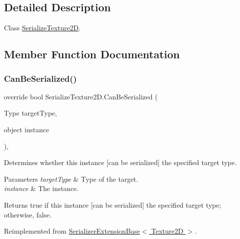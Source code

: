 \subsection{Detailed Description}
Class \hyperlink{class_serialize_texture2_d}{Serialize\+Texture2D}. 



\subsection{Member Function Documentation}
\mbox{\label{class_serialize_texture2_d_a4485a35955c52146f174efa44317787e}} 
\subsubsection{\texorpdfstring{Can\+Be\+Serialized()}{CanBeSerialized()}}
{\footnotesize\ttfamily override bool Serialize\+Texture2\+D.\+Can\+Be\+Serialized (\begin{DoxyParamCaption}\item[{Type}]{target\+Type,  }\item[{object}]{instance }\end{DoxyParamCaption})\hspace{0.3cm}{\ttfamily [inline]}, {\ttfamily [virtual]}}



Determines whether this instance \mbox{[}can be serialized\mbox{]} the specified target type. 


\begin{DoxyParams}{Parameters}
{\em target\+Type} & Type of the target.\\
\hline
{\em instance} & The instance.\\
\hline
\end{DoxyParams}
\begin{DoxyReturn}{Returns}
{\ttfamily true} if this instance \mbox{[}can be serialized\mbox{]} the specified target type; otherwise, {\ttfamily false}.
\end{DoxyReturn}


Reimplemented from \hyperlink{class_serializer_extension_base_a50e69037fda6bdcc080cdc3c51d25b99}{Serializer\+Extension\+Base$<$ Texture2\+D $>$}.

\mbox{\label{class_serialize_texture2_d_a769620049aa1f3f3f7ff17f6cacd74a1}} 
